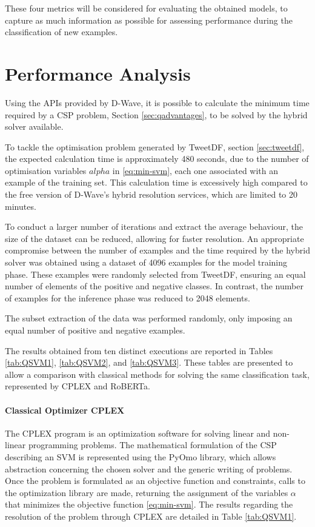 These four metrics will be considered for evaluating the obtained models, to capture as much information as possible for assessing performance during the classification of new examples.

\section{Performance Analysis}

Using the APIs provided by D-Wave, it is possible to calculate the minimum time required by a CSP problem, Section \ref{sec:qadvantages}, to be solved by the hybrid solver available.

To tackle the optimisation problem generated by TweetDF, section \ref{sec:tweetdf}, the expected calculation time is approximately 480 seconds, due to the number of optimisation variables $alpha$ in \ref{eq:min-svm}, each one associated with an example of the training set. 
This calculation time is excessively high compared to the free version of D-Wave's hybrid resolution services, which are limited to 20 minutes.

To conduct a larger number of iterations and extract the average behaviour, the size of the dataset can be reduced, allowing for faster resolution. 
An appropriate compromise between the number of examples and the time required by the hybrid solver was obtained using a dataset of 4096 examples for the model training phase. 
These examples were randomly selected from TweetDF, ensuring an equal number of elements of the positive and negative classes. 
In contrast, the number of examples for the inference phase was reduced to 2048 elements.

The subset extraction of the data was performed randomly, only imposing an equal number of positive and negative examples.

The results obtained from ten distinct executions are reported in Tables \ref{tab:QSVM1}, \ref{tab:QSVM2}, and \ref{tab:QSVM3}. These tables are presented to allow a comparison with classical methods for solving the same classification task, represented by CPLEX and RoBERTa.

\paragraph{Classical Optimizer CPLEX} The CPLEX program\cite{cplex} is an optimization software for solving linear and non-linear programming problems. The mathematical formulation of the CSP describing an SVM is represented using the PyOmo library, which allows abstraction concerning the chosen solver and the generic writing of problems. Once the problem is formulated as an objective function and constraints, calls to the optimization library are made, returning the assignment of the variables $\alpha$ that minimizes the objective function \ref{eq:min-svm}. The results regarding the resolution of the problem through CPLEX are detailed in Table \ref{tab:QSVM1}.

